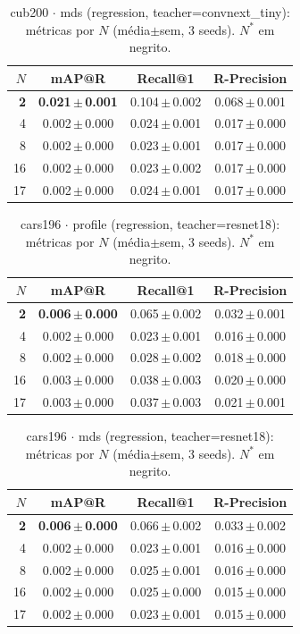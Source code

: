\begin{table}[t]\centering
\caption{cub200 $\cdot$ mds (regression, teacher=convnext\_tiny): métricas por $N$ (média$\pm$sem, 3 seeds). $N^*$ em negrito.}
\begin{tabular}{rccc}\toprule
$N$ & mAP@R & Recall@1 & R-Precision \\ \midrule
\textbf{2} & \textbf{0.021\,$\pm$\,0.001} & 0.104\,$\pm$\,0.002 & 0.068\,$\pm$\,0.001 \\
4 & 0.002\,$\pm$\,0.000 & 0.024\,$\pm$\,0.001 & 0.017\,$\pm$\,0.000 \\
8 & 0.002\,$\pm$\,0.000 & 0.023\,$\pm$\,0.001 & 0.017\,$\pm$\,0.000 \\
16 & 0.002\,$\pm$\,0.000 & 0.023\,$\pm$\,0.002 & 0.017\,$\pm$\,0.000 \\
17 & 0.002\,$\pm$\,0.000 & 0.024\,$\pm$\,0.001 & 0.017\,$\pm$\,0.000 \\
\bottomrule\end{tabular}\end{table}

\begin{table}[t]\centering
\caption{cars196 $\cdot$ profile (regression, teacher=resnet18): métricas por $N$ (média$\pm$sem, 3 seeds). $N^*$ em negrito.}
\begin{tabular}{rccc}\toprule
$N$ & mAP@R & Recall@1 & R-Precision \\ \midrule
\textbf{2} & \textbf{0.006\,$\pm$\,0.000} & 0.065\,$\pm$\,0.002 & 0.032\,$\pm$\,0.001 \\
4 & 0.002\,$\pm$\,0.000 & 0.023\,$\pm$\,0.001 & 0.016\,$\pm$\,0.000 \\
8 & 0.002\,$\pm$\,0.000 & 0.028\,$\pm$\,0.002 & 0.018\,$\pm$\,0.000 \\
16 & 0.003\,$\pm$\,0.000 & 0.038\,$\pm$\,0.003 & 0.020\,$\pm$\,0.000 \\
17 & 0.003\,$\pm$\,0.000 & 0.037\,$\pm$\,0.003 & 0.021\,$\pm$\,0.001 \\
\bottomrule\end{tabular}\end{table}

\begin{table}[t]\centering
\caption{cars196 $\cdot$ mds (regression, teacher=resnet18): métricas por $N$ (média$\pm$sem, 3 seeds). $N^*$ em negrito.}
\begin{tabular}{rccc}\toprule
$N$ & mAP@R & Recall@1 & R-Precision \\ \midrule
\textbf{2} & \textbf{0.006\,$\pm$\,0.000} & 0.066\,$\pm$\,0.002 & 0.033\,$\pm$\,0.002 \\
4 & 0.002\,$\pm$\,0.000 & 0.023\,$\pm$\,0.001 & 0.016\,$\pm$\,0.000 \\
8 & 0.002\,$\pm$\,0.000 & 0.025\,$\pm$\,0.001 & 0.016\,$\pm$\,0.000 \\
16 & 0.002\,$\pm$\,0.000 & 0.025\,$\pm$\,0.000 & 0.015\,$\pm$\,0.000 \\
17 & 0.002\,$\pm$\,0.000 & 0.023\,$\pm$\,0.001 & 0.015\,$\pm$\,0.000 \\
\bottomrule\end{tabular}\end{table}

